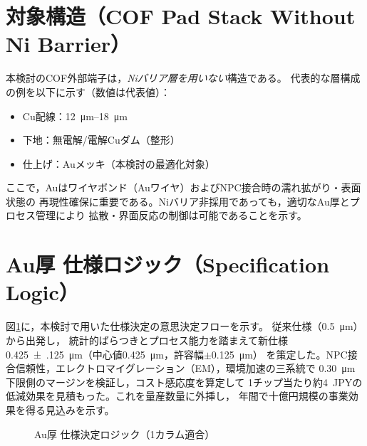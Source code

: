 \documentclass[conference]{IEEEtran}
\begin{document}
\section{対象構造（COF Pad Stack Without Ni Barrier）}
本検討のCOF外部端子は，\emph{Niバリア層を用いない}構造である。
代表的な層構成の例を以下に示す（数値は代表値）：
\begin{itemize}
  \item Cu配線：\SIrange{12}{18}{\micro\meter}
  \item 下地：無電解/電解Cuダム（整形）
  \item 仕上げ：Auメッキ（本検討の最適化対象）
\end{itemize}
ここで，Auはワイヤボンド（Auワイヤ）およびNPC接合時の濡れ拡がり・表面状態の
再現性確保に重要である。Niバリア非採用であっても，適切なAu厚とプロセス管理により
拡散・界面反応の制御は可能であることを示す。

\section{Au厚 仕様ロジック（Specification Logic）}
図\ref{fig:au-logic}に，本検討で用いた仕様決定の意思決定フローを示す。
従来仕様（\SI{0.5}{\micro\meter}）から出発し，
統計的ばらつきとプロセス能力を踏まえて新仕様
\SI{0.425(125)}{\micro\meter}（中心値\SI{0.425}{\micro\meter}，許容幅\(\pm\)\SI{0.125}{\micro\meter}）
を策定した。NPC接合信頼性，エレクトロマイグレーション（EM），環境加速の三系統で
\SI{0.30}{\micro\meter} 下限側のマージンを検証し，コスト感応度を算定して
1チップ当たり約\SI{4}{JPY}の低減効果を見積もった。これを量産数量に外挿し，
年間で十億円規模の事業効果を得る見込みを示す。

\begin{figure}[t]
  \centering
  \caption{Au厚 仕様決定ロジック（1カラム適合）}
  \label{fig:au-logic}
\end{figure}
\end{document}
